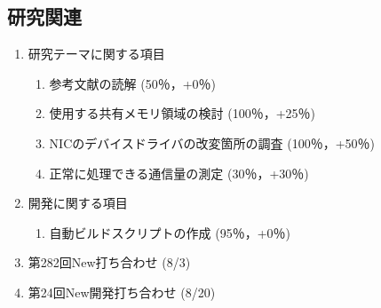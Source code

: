\documentclass[fleqn, 14pt]{extarticle}
\begin{document}
    \subsection{研究関連}
    \label{sec-2-1}
    \begin{enumerate}

        \item 研究テーマに関する項目
            \hfill
            \label{enum-research1}
            \begin{enumerate}

                \item 参考文献の読解
                    \hfill
                    \label{enum-1-A}
                    (50％，+0％)

                \item 使用する共有メモリ領域の検討
                    \hfill
                    \label{enum-1-B}
                    (100％，+25％)

                \item NICのデバイスドライバの改変箇所の調査
                    \hfill
                    \label{enum-1-C}
                    (100％，+50％)

                \item 正常に処理できる通信量の測定
                    \hfill
                    \label{enum-1-D}
                    (30％，+30％)

            \end{enumerate}

        \item 開発に関する項目
            \hfill
            \label{enum-research2}
            \begin{enumerate}

                \item 自動ビルドスクリプトの作成
                    \hfill
                    \label{enum-2-A}
                    (95％，+0％)

            \end{enumerate}

        \item 第282回New打ち合わせ
            \hfill
            \label{enum-research3}
            (8/3)

        \item 第24回New開発打ち合わせ 
            \hfill
            \label{enum-research3}
            (8/20)

    \end{enumerate}
\end{document}
